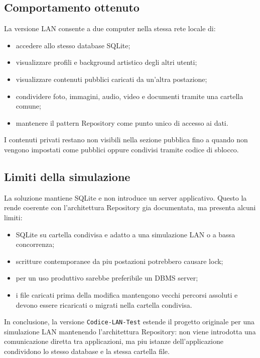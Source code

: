 \documentclass[a4paper,12pt]{article}
\begin{document}
\subsection{Comportamento ottenuto}

La versione LAN consente a due computer nella stessa rete locale di:

\begin{itemize}
    \item accedere allo stesso database SQLite;
    \item visualizzare profili e background artistico degli altri utenti;
    \item visualizzare contenuti pubblici caricati da un'altra postazione;
    \item condividere foto, immagini, audio, video e documenti tramite una
    cartella comune;
    \item mantenere il pattern Repository come punto unico di accesso ai dati.
\end{itemize}

I contenuti privati restano non visibili nella sezione pubblica fino a quando non
vengono impostati come pubblici oppure condivisi tramite codice di sblocco.

\subsection{Limiti della simulazione}

La soluzione mantiene SQLite e non introduce un server applicativo. Questo la rende
coerente con l'architettura Repository gia documentata, ma presenta alcuni limiti:

\begin{itemize}
    \item SQLite su cartella condivisa e adatto a una simulazione LAN o a bassa
    concorrenza;
    \item scritture contemporanee da piu postazioni potrebbero causare lock;
    \item per un uso produttivo sarebbe preferibile un DBMS server;
    \item i file caricati prima della modifica mantengono vecchi percorsi assoluti
    e devono essere ricaricati o migrati nella cartella condivisa.
\end{itemize}

In conclusione, la versione \texttt{Codice-LAN-Test} estende il progetto originale
per una simulazione LAN mantenendo l'architettura Repository: non viene introdotta
una comunicazione diretta tra applicazioni, ma piu istanze dell'applicazione
condividono lo stesso database e la stessa cartella file.
\end{document}
